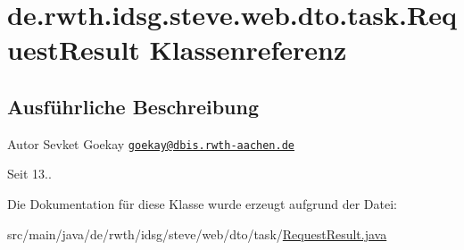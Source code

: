 \hypertarget{classde_1_1rwth_1_1idsg_1_1steve_1_1web_1_1dto_1_1task_1_1_request_result}{\section{de.\-rwth.\-idsg.\-steve.\-web.\-dto.\-task.\-Request\-Result Klassenreferenz}
\label{classde_1_1rwth_1_1idsg_1_1steve_1_1web_1_1dto_1_1task_1_1_request_result}
}


\subsection{Ausführliche Beschreibung}
\begin{DoxyAuthor}{Autor}
Sevket Goekay \href{mailto:goekay@dbis.rwth-aachen.de}{\tt goekay@dbis.\-rwth-\/aachen.\-de} 
\end{DoxyAuthor}
\begin{DoxySince}{Seit}
13.. 
\end{DoxySince}


Die Dokumentation für diese Klasse wurde erzeugt aufgrund der Datei\-:\begin{DoxyCompactItemize}
\item 
src/main/java/de/rwth/idsg/steve/web/dto/task/\hyperlink{_request_result_8java}{Request\-Result.\-java}\end{DoxyCompactItemize}
